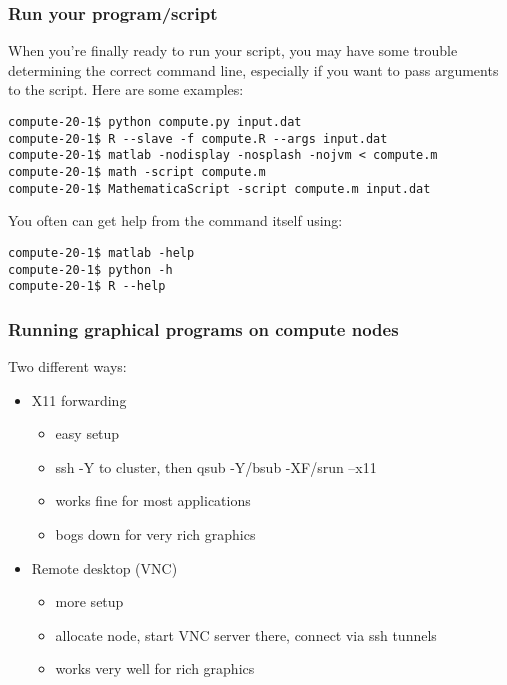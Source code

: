 \documentclass[10pt]{beamer}
\begin{document}
\begin{frame}[fragile]
\frametitle{Run your program/script}
When you're finally ready to run your script, you may have some
trouble determining the correct command line, especially if you want to
pass arguments to the script.  Here are some examples:

\begin{verbatim}
compute-20-1$ python compute.py input.dat
compute-20-1$ R --slave -f compute.R --args input.dat
compute-20-1$ matlab -nodisplay -nosplash -nojvm < compute.m
compute-20-1$ math -script compute.m
compute-20-1$ MathematicaScript -script compute.m input.dat
\end{verbatim}

You often can get help from the command itself using:

\begin{verbatim}
compute-20-1$ matlab -help
compute-20-1$ python -h
compute-20-1$ R --help
\end{verbatim}
\end{frame}

\begin{frame}[fragile]
\frametitle{Running graphical programs on compute nodes}
Two different ways:
\begin{itemize}
\item X11 forwarding
\begin{itemize}
\item easy setup
\item ssh -Y to cluster, then qsub -Y/bsub -XF/srun --x11
\item works fine for most applications
\item bogs down for very rich graphics
\end{itemize}
\item Remote desktop (VNC)
\begin{itemize}
\item more setup
\item allocate node, start VNC server there, connect via ssh tunnels
\item works very well for rich graphics
\end{itemize}
\end{itemize}
\end{frame}
\end{document}
